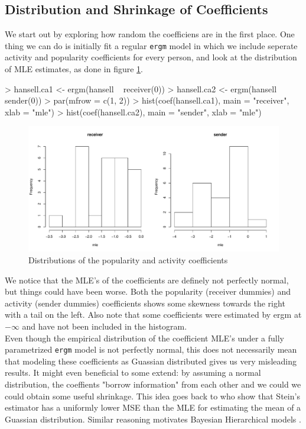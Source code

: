 \documentclass[a4paper]{article}
\begin{document}
\subsection{Distribution and Shrinkage of Coefficients}

We start out by exploring how random the coefficiens are in the first place. One thing we can do is initially
fit a regular \texttt{ergm} model in which we include seperate activity and popularity coefficients for every person, 
and look at the distribution of MLE estimates, as done in figure \ref{fig:coefhist}.
\begin{Schunk}
\begin{Sinput}
> hansell.ca1 <- ergm(hansell ~ receiver(0))
> hansell.ca2 <- ergm(hansell ~ sender(0))
> par(mfrow = c(1, 2))
> hist(coef(hansell.ca1), main = "receiver", xlab = "mle")
> hist(coef(hansell.ca2), main = "sender", xlab = "mle")
\end{Sinput}
\end{Schunk}
\begin{figure}[h!]
\centering
\includegraphics{paper-coefhist}
\caption{Distributions of the popularity and activity coefficients}
\label{fig:coefhist}
\end{figure}

We notice that the MLE's of the coefficients are definely not perfectly normal, but things could have been worse. 
Both the popularity (receiver dummies) and activity (sender dummies) coefficients shows some skewness towards the right with a tail on the left. 
Also note that some coefficients were estimated by ergm at $-\infty$ and have not been included in the histogram. \\

Even though the empirical distribution of the coefficient MLE's under a fully parametrized \texttt{ergm} model is not perfectly normal, 
this does not necessarily mean that modeling these coefficients as Guassian distributed gives us very misleading results. 
It might even beneficial to some extend: by assuming a normal distribution, the coeffients "borrow information" from each other
and we could we could obtain some useful shrinkage. This idea goes back to \citet{james1961estimation} who show that Stein's estimator
has a uniformly lower MSE than the MLE for estimating the mean of a Guassian distribution. 
Similar reasoning motivates Bayesian Hierarchical models \citep{gelman2004bayesian}. \\
\end{document}
